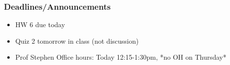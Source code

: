 
\begin{frame}
    \frametitle{Deadlines/Announcements}
\begin{itemize}
        \item HW 6 due today
        \item Quiz 2 tomorrow in class (not discussion)
        \item Prof Stephen Office hours: Today 12:15-1:30pm, *no OH on Thursday*
        \end{itemize}
\end{frame}
